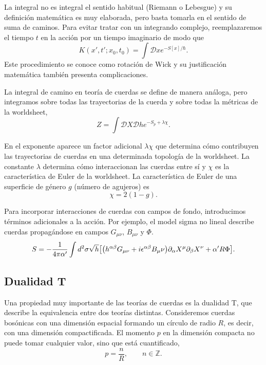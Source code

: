 La integral no es integral el sentido habitual (Riemann o Lebesgue) y su definición matemática
es muy elaborada, pero basta tomarla en el sentido de suma de caminos.
Para evitar tratar con un integrando complejo, reemplazaremos el tiempo $t$ en la acción por un tiempo imaginario de modo que
\begin{equation}
  K(x',t';x_0,t_0) = \int \mathcal Dx e^{- S[x]/ \hbar}.
\end{equation}
Este procedimiento se conoce como rotación de Wick y su justificación matemática también presenta complicaciones.


La integral de camino en teoría de cuerdas se define de manera análoga, pero integramos 
sobre todas las trayectorias de la cuerda y sobre todas la métricas de la worldsheet,
\begin{equation}
  Z = \int \mathcal DX \mathcal Dh e^{-S_p+\lambda \chi}.
\end{equation}

En el exponente aparece un factor adicional $\lambda\chi$ que determina cómo contribuyen las trayectorias
de cuerdas en una determinada topología de la worldsheet.
La constante $\lambda$ determina cómo interaccionan las cuerdas entre sí y $\chi$ es la característica
de Euler de la worldsheet.
La característica de Euler de una superficie de género $g$ (número de agujeros) es
\begin{equation}
  \chi = 2(1-g).
\end{equation}


Para incorporar interacciones de cuerdas con campos de fondo, introducimos términos adicionales a la acción.
Por ejemplo, el model sigma no lineal describe cuerdas propagándose en campos $G_{\mu\nu}$, $B_{\mu\nu}$ y $\Phi$.
\begin{equation}
  S = -\frac{1}{4\pi \alpha'}\int d^2 \sigma \sqrt h \qty[\qty(h^{\alpha\beta}G_{\mu\nu} + i\epsilon^{\alpha\beta}B_\mu\nu)\partial_\alpha X^\mu
  \partial_\beta X^\nu +\alpha'R\Phi].
\end{equation}

\subsection{Dualidad T}
\label{sec:dual}
Una propiedad muy importante de las teorías de cuerdas es la dualidad T,
que describe la equivalencia entre dos teorías distintas.
Consideremos cuerdas bosónicas con una dimensión espacial formando un círculo de radio $R$,
es decir, con una dimensión compactificada.
El momento $p$ en la dimensión compacta no puede tomar cualquier valor, sino que está cuantificado,
\begin{equation}
  p = \frac{n}{R}, \qquad n \in \mathbb Z.
\end{equation}

